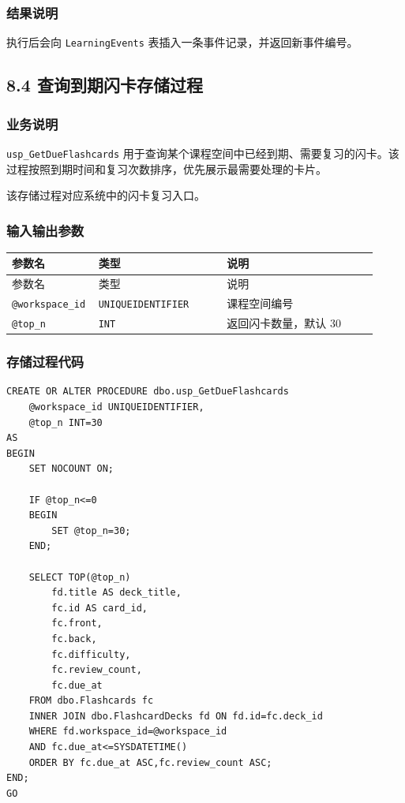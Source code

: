 \documentclass[10pt,a4paper,fontset=none]{ctexart}
\begin{document}
\subsubsection*{结果说明}

执行后会向 \texttt{LearningEvents} 表插入一条事件记录，并返回新事件编号。\par

\subsection*{8.4 查询到期闪卡存储过程}

\subsubsection*{业务说明}

\texttt{usp\_GetDueFlashcards} 用于查询某个课程空间中已经到期、需要复习的闪卡。该过程按照到期时间和复习次数排序，优先展示最需要处理的卡片。\par

该存储过程对应系统中的闪卡复习入口。\par

\subsubsection*{输入输出参数}

\begingroup\scriptsize
\renewcommand{\arraystretch}{1.18}
\setlength{\LTleft}{0pt}
\setlength{\LTright}{0pt}
\begin{longtable}{>{\raggedright\arraybackslash}p{0.18\linewidth}>{\raggedright\arraybackslash}p{0.34\linewidth}>{\raggedright\arraybackslash}p{0.40\linewidth}}
\toprule
参数名 & 类型 & 说明 \\
\midrule
\endfirsthead
\toprule
参数名 & 类型 & 说明 \\
\midrule
\endhead
\texttt{@workspace\_id} & \texttt{UNIQUEIDENTIFIER} & 课程空间编号 \\
\texttt{@top\_n} & \texttt{INT} & 返回闪卡数量，默认 30 \\
\bottomrule
\end{longtable}
\endgroup


\subsubsection*{存储过程代码}

\begin{Verbatim}[fontsize=\scriptsize,frame=single]
CREATE OR ALTER PROCEDURE dbo.usp_GetDueFlashcards
    @workspace_id UNIQUEIDENTIFIER,
    @top_n INT=30
AS
BEGIN
    SET NOCOUNT ON;

    IF @top_n<=0
    BEGIN
        SET @top_n=30;
    END;

    SELECT TOP(@top_n)
        fd.title AS deck_title,
        fc.id AS card_id,
        fc.front,
        fc.back,
        fc.difficulty,
        fc.review_count,
        fc.due_at
    FROM dbo.Flashcards fc
    INNER JOIN dbo.FlashcardDecks fd ON fd.id=fc.deck_id
    WHERE fd.workspace_id=@workspace_id
    AND fc.due_at<=SYSDATETIME()
    ORDER BY fc.due_at ASC,fc.review_count ASC;
END;
GO
\end{Verbatim}
\end{document}
